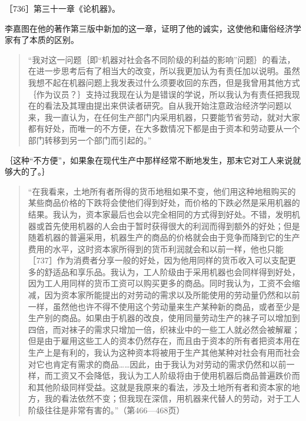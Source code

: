
［736］第三十一章《论机器》。

李嘉图在他的著作第三版中新加的这一章，证明了他的诚实，这使他和庸俗经济学家有了本质的区别。

\begin{quote}{“我对这一问题｛即“机器对社会各不同阶级的利益的影响”问题｝的看法，在进一步思考后有了相当大的改变，所以我更加认为有责任加以说明。虽然我想不起在机器问题上我发表过什么须要收回的东西，但是我曾用其他方式｛作为议员？｝支持过我现在认为是错误的学说，所以我认为有责任把我现在的看法及其理由提出来供读者研究。自从我开始注意政治经济学问题以来，我一直认为，在任何生产部门内采用机器，只要能节省劳动，就对大家都有好处，而唯一的不方便，在大多数情况下都是由于资本和劳动要从一个部门转移到另一个部门而引起的。”}\end{quote}

｛这种“不方便”，如果象在现代生产中那样经常不断地发生，那末它对工人来说就够大的了。｝

\begin{quote}{“在我看来，土地所有者所得的货币地租如果不变，他们用这种地租购买的某些商品价格的下跌将会使他们得到好处，而价格的下跌必然是采用机器的结果。我认为，资本家最后也会以完全相同的方式得到好处。不错，发明机器或首先使用机器的人会由于暂时获得很大的利润而得到额外的好处；但是随着机器的普遍采用，机器生产的商品的价格就会由于竞争而降到它的生产费用的水平，这时资本家所得到的货币利润就会和以前一样，他也只能［737］作为消费者分享一般的好处，因为他用同样的货币收入可以支配更多的舒适品和享乐品。我认为，工人阶级由于采用机器也会同样得到好处，因为工人用同样的货币工资可以购买更多的商品。同时我认为，工资不会缩减，因为资本家所能提出的对劳动的需求以及所能使用的劳动量仍然和以前一样，虽然他也许不得不使用这个劳动量来生产某种新的商品，或者至少是生产别的商品。如果由于机器的改良，使用同量劳动生产的袜子可以增加到四倍，而对袜子的需求只增加一倍，织袜业中的一些工人就必然会被解雇；但是由于雇用这些工人的资本仍然存在，而且由于资本的所有者把资本用在生产上是有利的，我认为这种资本将被用于生产其他某种对社会有用而社会对它也肯定有需求的商品……因此，由于我认为对劳动的需求仍然和以前一样，而工资又不会降低，我认为工人阶级将由于使用机器后商品普遍跌价而和其他阶级同样受益。这就是我原来的看法，涉及土地所有者和资本家的地方，我的看法依然不变；但我现在深信，用机器来代替人的劳动，对于工人阶级往往是非常有害的。”（第466—468页）}\end{quote}

